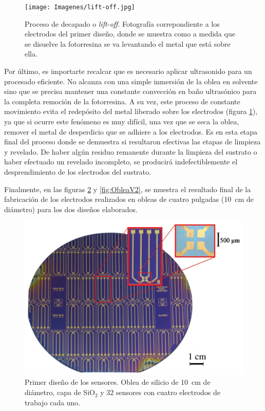 					  \begin{figure}[ht!]
					  \begin{center}
					  \texttt{[image: Imagenes/lift-off.jpg]}
					  \caption[Proceso de decapado o\textit{ lift-off}]{Proceso de decapado o\textit{ lift-off}. Fotografía correpondiente a los electrodos del primer diseño, donde se muestra como a medida que se disuelve la fotorresina se va levantando el metal que está sobre ella.}
					  \label{fig:ultrasonido}
					  \end{center}
					  \end{figure}

		 Por último, es importarte recalcar que es necesario aplicar ultrasonido para un procesado eficiente. No alcanza con una simple inmersión de la oblea en solvente sino que se precisa mantener una constante convección en baño ultrasónico para la completa remoción de la fotorresina. A su vez, este proceso de constante movimiento evita el redepósito del metal liberado sobre los electrodos (figura \ref{fig:ultrasonido}), ya que si ocurre este fenómeno es muy difícil, una vez que se seca la oblea, remover el metal de desperdicio que se adhiere a los electrodos. Es en esta etapa final del proceso donde se demuestra si resultaron efectivas las etapas de limpieza y revelado. De haber algún residuo remanente durante la limpieza del sustrato o haber efectuado un revelado incompleto, se producirá indefectiblemente el desprendimiento de los electrodos del sustrato.

		 Finalmente, en las figuras \ref{fig:ObleaV1} y \ref{fig:ObleaV2}, se muestra el resultado final de la fabricación de los electrodos realizados en obleas de cuatro pulgadas (\SI{10}{\cm} de diámetro) para los dos diseños elaborados.\pagebreak
		

		 			  \clearpage
					  \begin{figure}[ht!]
					  \begin{center}
					  \includegraphics[width=\textwidth]{Imagenes/ObleaV1.jpg}
					  \caption[Electrodos, primera versión]{Primer diseño de los sensores. Oblea de silicio de \SI{10}{cm} de diámetro, capa de SiO$_2$ y 32 sensores con cuatro electrodos de trabajo cada uno.}
					  \label{fig:ObleaV1}
					  \end{center}
					  \end{figure} 	

